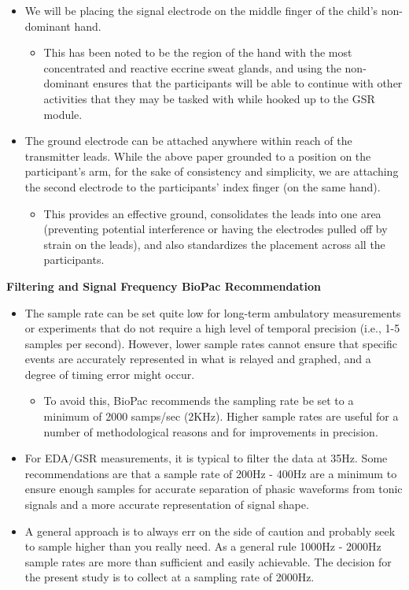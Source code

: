 \documentclass[]{book}
\providecommand{\tightlist}{%
  \setlength{\itemsep}{0pt}\setlength{\parskip}{0pt}}
\begin{document}
\begin{itemize}
\tightlist
\item
  We will be placing the signal electrode on the middle finger of the child's non-dominant hand.

  \begin{itemize}
  \tightlist
  \item
    This has been noted to be the region of the hand with the most concentrated and reactive eccrine sweat glands, and using the non-dominant ensures that the participants will be able to continue with other activities that they may be tasked with while hooked up to the GSR module.
  \end{itemize}
\item
  The ground electrode can be attached anywhere within reach of the transmitter leads. While the above paper grounded to a position on the participant's arm, for the sake of consistency and simplicity, we are attaching the second electrode to the participants' index finger (on the same hand).

  \begin{itemize}
  \tightlist
  \item
    This provides an effective ground, consolidates the leads into one area (preventing potential interference or having the electrodes pulled off by strain on the leads), and also standardizes the placement across all the participants.
  \end{itemize}
\end{itemize}

\textbf{Filtering and Signal Frequency BioPac Recommendation}

\begin{itemize}
\tightlist
\item
  The sample rate can be set quite low for long-term ambulatory measurements or experiments that do not require a high level of temporal precision (i.e., 1-5 samples per second). However, lower sample rates cannot ensure that specific events are accurately represented in what is relayed and graphed, and a degree of timing error might occur.

  \begin{itemize}
  \tightlist
  \item
    To avoid this, BioPac recommends the sampling rate be set to a minimum of 2000 samps/sec (2KHz). Higher sample rates are useful for a number of methodological reasons and for improvements in precision.
  \end{itemize}
\item
  For EDA/GSR measurements, it is typical to filter the data at 35Hz. Some recommendations are that a sample rate of 200Hz - 400Hz are a minimum to ensure enough samples for accurate separation of phasic waveforms from tonic signals and a more accurate representation of signal shape.
\item
  A general approach is to always err on the side of caution and probably seek to sample higher than you really need. As a general rule 1000Hz - 2000Hz sample rates are more than sufficient and easily achievable. The decision for the present study is to collect at a sampling rate of 2000Hz.
\end{itemize}
\end{document}
